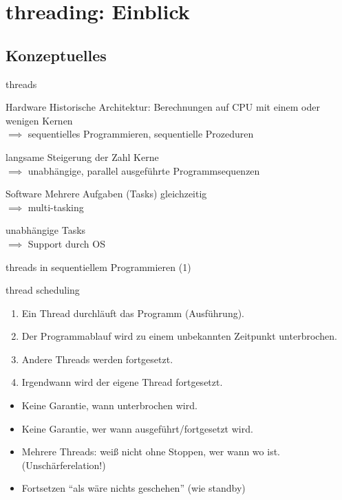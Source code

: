 \section{threading: Einblick}

\subsection{Konzeptuelles}

\begin{frame}{threads}
	\begin{block}{Hardware}
		Historische Architektur: Berechnungen auf CPU mit einem oder wenigen Kernen \\
		$\implies$ sequentielles Programmieren, sequentielle Prozeduren
		
		\vspace{1em}
		
		langsame Steigerung der Zahl Kerne \\
		$\implies$ unabhängige, parallel ausgeführte Programmsequenzen
	\end{block}
	
	\pause
	\vspace{1em}
	
	\begin{block}{Software}
		Mehrere Aufgaben (Tasks) gleichzeitig \\
		$\implies$ multi-tasking
		
		\vspace{1em}
		
		unabhängige Tasks \\
		$\implies$ Support durch OS
	\end{block}
\end{frame}

\begin{frame}{threads in sequentiellem Programmieren (1)}
	\begin{block}{thread scheduling}
		\begin{enumerate}
			\item Ein Thread durchläuft das Programm (Ausführung).
			\item Der Programmablauf wird zu einem unbekannten Zeitpunkt unterbrochen.
			\item Andere Threads werden fortgesetzt.
			\item Irgendwann wird der eigene Thread fortgesetzt.
		\end{enumerate}
		
		\pause
		
		\begin{itemize}
			\item Keine Garantie, wann unterbrochen wird.
			\item Keine Garantie, wer wann ausgeführt/fortgesetzt wird.
			\item Mehrere Threads: weiß nicht ohne Stoppen, wer wann wo ist. (Unschärferelation!)
			\item Fortsetzen \enquote{als wäre nichts geschehen} (wie standby)
		\end{itemize}
	\end{block}
\end{frame}

